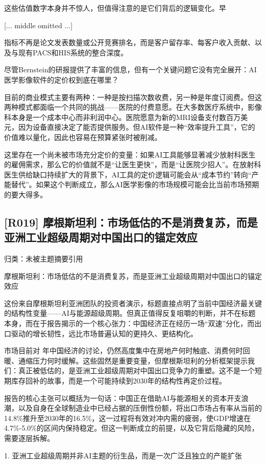 \documentclass[11pt]{ctexart}
\begin{document}
这些估值数字本身并不惊人，但值得注意的是它们背后的逻辑变化。早

[... middle omitted ...]

指标不再是论文发表数量或公开竞赛排名，而是客户留存率、每客户收入贡献、以及与现有PACS和HIS系统的整合深度。

尽管Bernstein的研报提供了丰富的信息，但有一个关键问题它没有完全展开：AI医学影像软件的定价权到底在哪里？

目前的商业模式主要有两种：一种是按扫描次数收费，另一种是年度订阅费。但这两种模式都面临一个共同的挑战——医院的付费意愿。在大多数医疗系统中，影像科本身是一个成本中心而非利润中心。医院愿意为新的MRI设备支付数百万美元，因为设备直接决定了能否提供服务。但AI软件是一种“效率提升工具”，它的价值难以量化，因此也容易在预算紧张时被削减。

这里存在一个尚未被市场充分定价的变量：如果AI工具能够显著减少放射科医生的雇佣需求，那么它的价值就不是“让医生更快”，而是“让医院少招人”。在放射科医生供给缺口持续扩大的背景下，AI工具的定价逻辑可能会从“成本节约”转向“产能替代”。如果这个判断成立，那么AI医学影像的市场规模可能会比当前市场预期的要大得多。

\subsection{[R019] 摩根斯坦利：市场低估的不是消费复苏，而是亚洲工业超级周期对中国出口的锚定效应}
{\small\color{refgray}归类：未被主题摘要引用}

摩根斯坦利：市场低估的不是消费复苏，而是亚洲工业超级周期对中国出口的锚定效应

这份来自摩根斯坦利亚洲团队的投资者演示，标题直接点明了当前中国经济最关键的结构性变量——AI与能源超级周期。但真正值得反复咀嚼的判断，并不在标题本身，而在于报告揭示的一个核心张力：中国经济正在经历一场“双速”分化，而出口驱动的增长韧性，远比市场普遍认知的更持久、更结构化。

市场目前对 年中国经济的讨论，仍然高度集中在房地产何时触底、消费何时回暖、通缩压力何时缓解。这些固然是重要变量，但摩根斯坦利的分析框架提示我们：真正被低估的，是亚洲工业超级周期对中国出口竞争力的重塑。这不是一个短期库存回补的故事，而是一个可能持续到2030年的结构性再定价过程。

报告的核心主张可以概括为一句话：中国正在借助AI与能源相关的资本开支浪潮，以及自身在全球制造业中已经占据的压倒性份额，将出口市场占有率从当前的14.8\%推升至2030年的16.5\%，这一过程将有效对冲内需的疲弱，使GDP增速在4.7\%-5.0\%的区间内保持稳定。但这一判断成立的前提，以及它背后隐藏的风险，需要逐层拆解。

1. 亚洲工业超级周期并非AI主题的衍生品，而是一次广泛且独立的产能扩张
\end{document}
